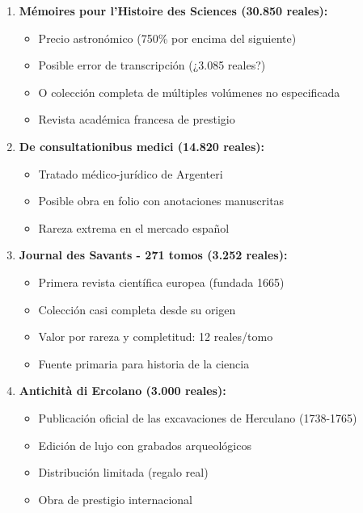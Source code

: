 \documentclass[12pt,a4paper]{article}
\begin{document}
\begin{enumerate}
    \item \textbf{Mémoires pour l'Histoire des Sciences (30.850 reales):}
    \begin{itemize}
        \item Precio astronómico (750\% por encima del siguiente)
        \item Posible error de transcripción (¿3.085 reales?)
        \item O colección completa de múltiples volúmenes no especificada
        \item Revista académica francesa de prestigio
    \end{itemize}

    \item \textbf{De consultationibus medici (14.820 reales):}
    \begin{itemize}
        \item Tratado médico-jurídico de Argenteri
        \item Posible obra en folio con anotaciones manuscritas
        \item Rareza extrema en el mercado español
    \end{itemize}

    \item \textbf{Journal des Savants - 271 tomos (3.252 reales):}
    \begin{itemize}
        \item Primera revista científica europea (fundada 1665)
        \item Colección casi completa desde su origen
        \item Valor por rareza y completitud: 12 reales/tomo
        \item Fuente primaria para historia de la ciencia
    \end{itemize}

    \item \textbf{Antichità di Ercolano (3.000 reales):}
    \begin{itemize}
        \item Publicación oficial de las excavaciones de Herculano (1738-1765)
        \item Edición de lujo con grabados arqueológicos
        \item Distribución limitada (regalo real)
        \item Obra de prestigio internacional
    \end{itemize}


\end{enumerate}
\end{document}
